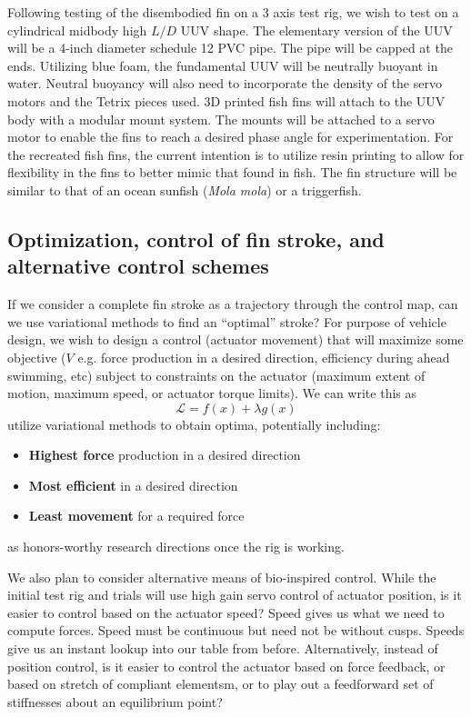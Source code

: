 \documentclass[twocolumn,10pt]{IEEEtran}
\begin{document}
Following testing of the disembodied fin on a 3 axis test rig, we wish to test on a cylindrical midbody high $L/D$ UUV shape. The elementary version of the UUV will be a 4-inch diameter schedule 12 PVC pipe.  The pipe will be capped at the ends.  Utilizing blue foam, the fundamental UUV will be neutrally buoyant in water.  Neutral buoyancy will also need to incorporate the density of the servo motors and the Tetrix pieces used.  3D printed fish fins will attach to the UUV body with a modular mount system.  The mounts will be attached to a servo motor to enable the fins to reach a desired phase angle for experimentation.  For the recreated fish fins, the current intention is to utilize resin printing to allow for flexibility in the fins to better mimic that found in fish.  The fin structure will be similar to that of an ocean sunfish (\emph{Mola mola}) or a triggerfish. 

\subsection{Optimization, control of fin stroke, and alternative control schemes}
If we consider a complete fin stroke as a trajectory through the control map, can we use variational methods to find an ``optimal'' stroke? For purpose of vehicle design, we wish to design a control (actuator movement) that will maximize some objective ($V$ e.g. force production in a desired direction, efficiency during ahead swimming, etc) subject to constraints on the actuator (maximum extent of motion, maximum speed, or actuator torque limits). We can write this as
\begin{equation}
\mathcal{L} = f(x) + \lambda g(x)
\end{equation}
utilize variational methods to obtain optima, potentially including:
\begin{itemize}
\item \textbf{Highest force} production in a desired direction
\item \textbf{Most efficient} in a desired direction
\item \textbf{Least movement} for a required force
\end{itemize}
as honors-worthy research directions once the rig is working. 

We also plan to consider alternative means of bio-inspired control. While the initial test rig and trials will use high gain servo control of actuator position, is it easier to control based on the actuator speed? Speed gives us what we need to compute forces. Speed must be continuous but need not be without cusps. Speeds give us an instant lookup into our table from before. Alternatively, instead of position control, is it easier to control the actuator based on force feedback, or based on stretch of compliant elementsm, or to play out a feedforward set of stiffnesses about an equilibrium point? 
\end{document}
